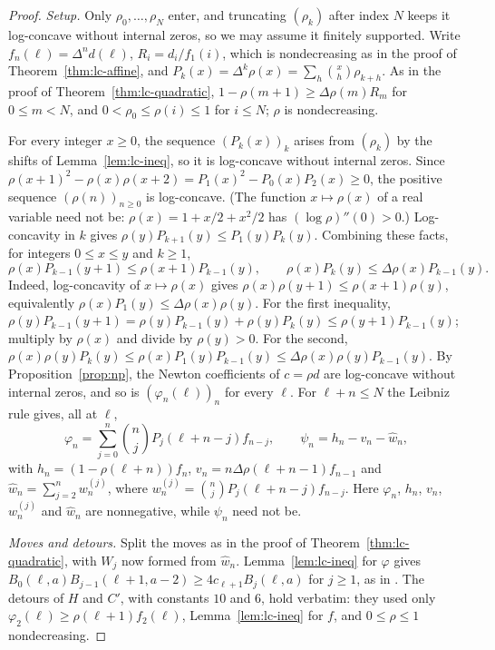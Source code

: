 \begin{proof}
\emph{Setup.} Only $\rho_0,\ldots,\rho_N$ enter, and truncating $(\rho_k)$ after index $N$ keeps it log-concave without internal zeros, so we may assume it finitely supported. Write $f_n(\ell)=\Delta^nd(\ell)$, $R_i=d_i/f_1(i)$, which is nondecreasing as in the proof of Theorem~\ref{thm:lc-affine}, and $P_k(x)=\Delta^k\rho(x)=\sum_h\binom xh\rho_{k+h}$. As in the proof of Theorem~\ref{thm:lc-quadratic}, $1-\rho(m+1)\geq\Delta\rho(m)R_m$ for $0\leq m<N$, and $0<\rho_0\leq\rho(i)\leq1$ for $i\leq N$; $\rho$ is nondecreasing.

For every integer $x\geq0$, the sequence $(P_k(x))_k$ arises from $(\rho_k)$ by the shifts of Lemma~\ref{lem:lc-ineq}, so it is log-concave without internal zeros. Since $\rho(x+1)^2-\rho(x)\rho(x+2)=P_1(x)^2-P_0(x)P_2(x)\geq0$, the positive sequence $(\rho(n))_{n\geq0}$ is log-concave. (The function $x\mapsto\rho(x)$ of a real variable need not be: $\rho(x)=1+x/2+x^2/2$ has $(\log\rho)''(0)>0$.) Log-concavity in $k$ gives $\rho(y)P_{k+1}(y)\leq P_1(y)P_k(y)$. Combining these facts, for integers $0\leq x\leq y$ and $k\geq1$,
\begin{equation}\label{eq:G-ratio}
\rho(x)P_{k-1}(y+1)\leq\rho(x+1)P_{k-1}(y),\qquad\rho(x)P_k(y)\leq\Delta\rho(x)P_{k-1}(y).
\end{equation}
Indeed, log-concavity of $x\mapsto\rho(x)$ gives $\rho(x)\rho(y+1)\leq\rho(x+1)\rho(y)$, equivalently $\rho(x)P_1(y)\leq\Delta\rho(x)\rho(y)$. For the first inequality, $\rho(y)P_{k-1}(y+1)=\rho(y)P_{k-1}(y)+\rho(y)P_k(y)\leq\rho(y+1)P_{k-1}(y)$; multiply by $\rho(x)$ and divide by $\rho(y)>0$. For the second, $\rho(x)\rho(y)P_k(y)\leq\rho(x)P_1(y)P_{k-1}(y)\leq\Delta\rho(x)\rho(y)P_{k-1}(y)$. By Proposition~\ref{prop:np}, the Newton coefficients of $c=\rho d$ are log-concave without internal zeros, and so is $(\varphi_n(\ell))_n$ for every $\ell$. For $\ell+n\leq N$ the Leibniz rule gives, all at $\ell$,
\[
\varphi_n=\sum_{j=0}^n\binom njP_j(\ell+n-j)f_{n-j},\qquad\psi_n=h_n-v_n-\widehat w_n,
\]
with $h_n=(1-\rho(\ell+n))f_n$, $v_n=n\Delta\rho(\ell+n-1)f_{n-1}$ and $\widehat w_n=\sum_{j=2}^nw^{(j)}_n$, where $w^{(j)}_n=\binom njP_j(\ell+n-j)f_{n-j}$. Here $\varphi_n$, $h_n$, $v_n$, $w^{(j)}_n$ and $\widehat w_n$ are nonnegative, while $\psi_n$ need not be.

\emph{Moves and detours.} Split the moves as in the proof of Theorem~\ref{thm:lc-quadratic}, with $W_j$ now formed from $\widehat w_n$. Lemma~\ref{lem:lc-ineq} for $\varphi$ gives $B_0(\ell,a)B_{j-1}(\ell+1,a-2)\geq4c_{\ell+1}B_j(\ell,a)$ for $j\geq1$, as in \cite[Lemma~]{P1}. The detours of $H$ and $C'$, with constants $10$ and $6$, hold verbatim: they used only $\varphi_2(\ell)\geq\rho(\ell+1)f_2(\ell)$, Lemma~\ref{lem:lc-ineq} for $f$, and $0\leq\rho\leq1$ nondecreasing.


\end{proof}
